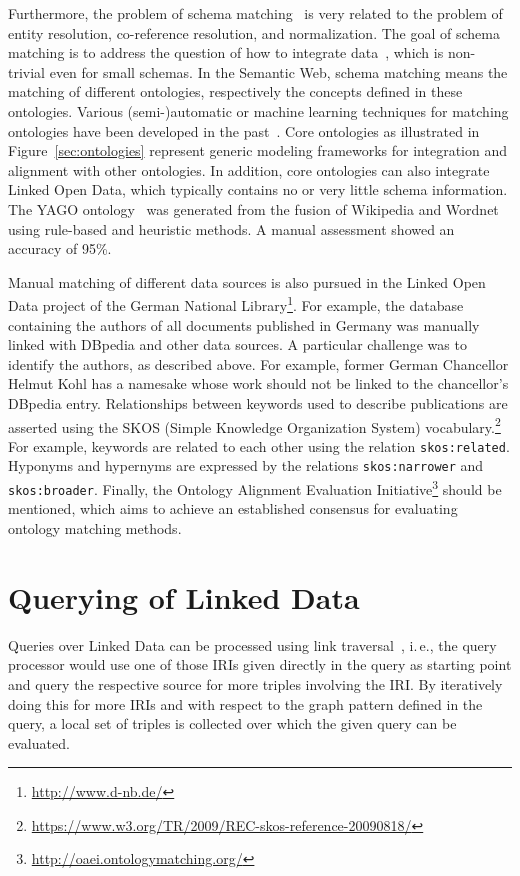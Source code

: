 \documentclass[a4paper,USenglish]{tgdk-v2021}
\newcommand{\concept}[1]{\texttt{#1}}
\newcommand{\myurl}[1]{\footnote{\url{#1}}}
\begin{document}
Furthermore, the problem of schema matching~\cite{WickKDD2008} is very related to the problem of entity resolution, co-reference resolution, and normalization.
The goal of schema matching is to address the question of how to integrate data~\cite{WickKDD2008}, which is non-trivial even for small schemas. 
In the Semantic Web, schema matching means the matching of different ontologies, respectively the concepts defined in these ontologies.
Various (semi-)automatic or machine learning techniques for matching ontologies have been developed in the past~\cite{euzenat2007b,Ehrig07,Blomqvist09}.
Core ontologies as illustrated in Figure~\ref{sec:ontologies} represent generic modeling frameworks for integration and alignment with other ontologies. 
In addition, core ontologies can also integrate Linked Open Data, which typically contains no or very little schema information.
The YAGO ontology~\cite{YagoWWW07} was generated from the fusion of Wikipedia and Wordnet using rule-based and heuristic methods.
A manual assessment showed an accuracy of 95\%.

Manual matching of different data sources is also pursued in the Linked Open Data project of the German National Library\myurl{http://www.d-nb.de/}.
For example, the database containing the authors of all documents published in Germany was manually linked with DBpedia and other data sources.
A particular challenge was to identify the authors, as described above.
For example, former German Chancellor Helmut Kohl has a namesake whose work should not be linked to the chancellor's DBpedia entry.
Relationships between keywords used to describe publications are asserted using the SKOS (Simple Knowledge Organization System) vocabulary.\myurl{https://www.w3.org/TR/2009/REC-skos-reference-20090818/}
For example, keywords are related to each other using the relation \concept{skos:related}.
Hyponyms and hypernyms are expressed by the relations \concept{skos:narrower} and \concept{skos:broader}.
Finally, the Ontology Alignment Evaluation Initiative\myurl{http://oaei.ontologymatching.org/} should be mentioned, which aims to achieve an established consensus for evaluating ontology matching methods.

\section{Querying of Linked Data}
\label{sec:distributeddataquerying}

Queries over Linked Data can be processed using link traversal~\cite{DBLP:conf/esws/Hartig11}, i.\,e., the query processor would use one of those IRIs given directly in the query as starting point and query the respective source for more triples involving the IRI. 
By iteratively doing this for more IRIs and with respect to the graph pattern defined in the query, a local set of triples is collected over which the given query can be evaluated.
\end{document}

